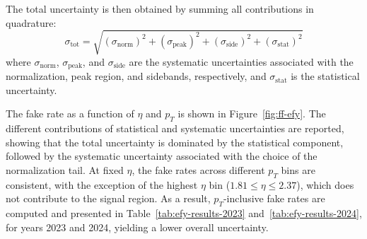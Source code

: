 The total uncertainty is then obtained by summing all contributions in quadrature:
\[
\sigma_{\text{tot}} = \sqrt{(\sigma_{\text{norm}})^2 + (\sigma_{\text{peak}})^2 + (\sigma_{\text{side}})^2 + (\sigma_{\text{stat}})^2}
\]
where \(\sigma_{\text{norm}}\), \(\sigma_{\text{peak}}\), and \(\sigma_{\text{side}}\) are the systematic uncertainties associated with the normalization, peak region, and sidebands, respectively, and \(\sigma_{\text{stat}}\) is the statistical uncertainty.

The fake rate as a function of $\eta$ and $p_T$ is shown in Figure~\ref{fig:ff-efy}. %
The different contributions of statistical and systematic uncertainties are reported, showing that the total uncertainty is dominated by the statistical component, followed by the systematic uncertainty associated with the choice of the normalization tail. 
At fixed $\eta$, the fake rates across different $p_T$ bins are consistent, with the exception of the highest $\eta$ bin ($1.81 \leq \eta \leq 2.37$), which does not contribute to the signal region. 
As a result, $p_T$-inclusive fake rates are computed and presented in Table~\ref{tab:efy-results-2023} and~\ref{tab:efy-results-2024}, for years 2023 and 2024, yielding a lower overall uncertainty.

